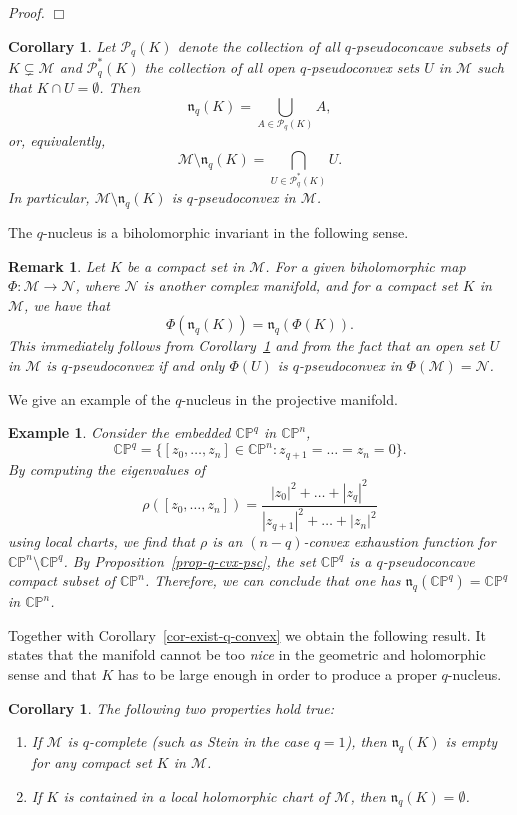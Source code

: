 \documentclass[11pt,a4paper]{article}
\newtheorem{cor}[lem]{Corollary}
\newtheorem{rem}[lem]{Remark}
\newtheorem{ex}[lem]{Example}
\newenvironment{proof}{\noindent\textit{Proof. }}{\hfill $\Box$\linebreak}
\newcommand{\CC}{\mathbb{C}}
\newcommand{\PP}{\mathbb{P}}
\newcommand{\Mcal}{\mathcal{M}}
\newcommand{\Ncal}{\mathcal{N}}
\newcommand{\Pcal}{\mathcal{P}}
\newcommand{\nuc}{\mathfrak{n}}
\begin{document}
\begin{proof}
\end{proof}

\begin{cor}\label{collect-qpsc-nucleus} Let $\Pcal_q(K)$ denote the collection of all $q$-pseudoconcave subsets of $K \subsetneq \Mcal$ and $\Pcal_q^*(K)$ the collection of all open $q$-pseudoconvex sets $U$ in $\Mcal$ such that $K \cap U = \emptyset$. Then
\[
\nuc_q(K) = \bigcup_{A \in \Pcal_q(K)} A,
\]
or, equivalently,
\[
\Mcal\setminus\nuc_q(K) = \bigcap_{U \in \Pcal_q^*(K)} U.
\]
In particular, $\Mcal\setminus\nuc_q(K)$ is $q$-pseudoconvex in $\Mcal$.
\end{cor}

The $q$-nucleus is a biholomorphic invariant in the following sense.

\begin{rem} 

Let $K$ be a compact set in $\Mcal$. For a given biholomorphic map $\Phi:\Mcal\to\Ncal$, where $\Ncal$ is another complex manifold, and for a compact set $K$ in $\Mcal$, we have that
\[
\Phi(\nuc_q(K)) = \nuc_q(\Phi(K)).
\]
This immediately follows from Corollary~\ref{collect-qpsc-nucleus} and from the fact that an open set $U$ in $\Mcal$ is $q$-pseudoconvex if and only $\Phi(U)$ is $q$-pseudoconvex in $\Phi(\Mcal)=\Ncal$.

\end{rem}


We give an example of the $q$-nucleus in the projective manifold.

\begin{ex}\label{q-nuc-cpn} Consider the embedded $\CC\PP^q$ in $\CC\PP^n$,
\[
\CC\PP^q=\{[z_0,\ldots,z_n] \in \CC\PP^n : z_{q+1}=\ldots=z_n=0\}.
\]
By computing the eigenvalues of
\[
\rho([z_0,\ldots,z_n])=\frac{|z_0|^2+\ldots+|z_q|^2}{|z_{q+1}|^2+\ldots+|z_n|^2}
\]
using local charts, we find that $\rho$ is an $(n-q)$-convex exhaustion function for $\CC\PP^n\setminus\CC\PP^q$. By Proposition~\ref{prop-q-cvx-psc}, the set $\CC\PP^q$ is a $q$-pseudoconcave compact subset of $\CC\PP^n$. Therefore, we can conclude that one has $\nuc_q(\CC\PP^q)=\CC\PP^q$ in $\CC\PP^n$. 
\end{ex}

Together with Corollary~\ref{cor-exist-q-convex} we obtain the following result. It states that the manifold cannot be too \emph{nice} in the geometric and holomorphic sense and that $K$ has to be large enough in order to produce a proper $q$-nucleus. 


\begin{cor} \label{cor-empty-q-nucleus} The following two properties hold true:
\begin{enumerate}

\item If $\Mcal$ is $q$-complete (such as Stein in the case $q=1$), then $\nuc_q(K)$ is empty for any compact set $K$ in $\Mcal$. 

\item If $K$ is contained in a local holomorphic chart of $\Mcal$, then $\nuc_q(K)=\emptyset$.

\end{enumerate}
\end{cor}
\end{document}
